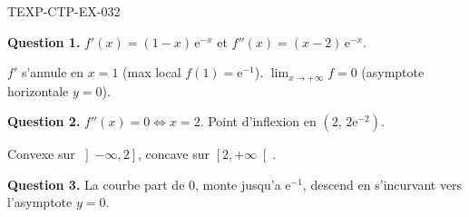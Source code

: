 \begin{corrige}{TEXP-CTP-EX-032}

\textbf{Question 1.} $f'(x) = (1-x)\,\mathrm{e}^{-x}$ et $f''(x) = (x-2)\,\mathrm{e}^{-x}$.


$f'$ s'annule en $x=1$ (max local $f(1)=\mathrm{e}^{-1}$). $\lim_{x\to+\infty} f = 0$ (asymptote horizontale $y=0$).

\textbf{Question 2.} $f''(x) = 0 \iff x = 2$. Point d'inflexion en $(2,\, 2\mathrm{e}^{-2})$.

Convexe sur $\left]-\infty, 2\right]$, concave sur $\left[2, +\infty\right[$.

\textbf{Question 3.} La courbe part de $0$, monte jusqu'a $\mathrm{e}^{-1}$, descend en s'incurvant vers l'asymptote $y=0$.

\end{corrige}

